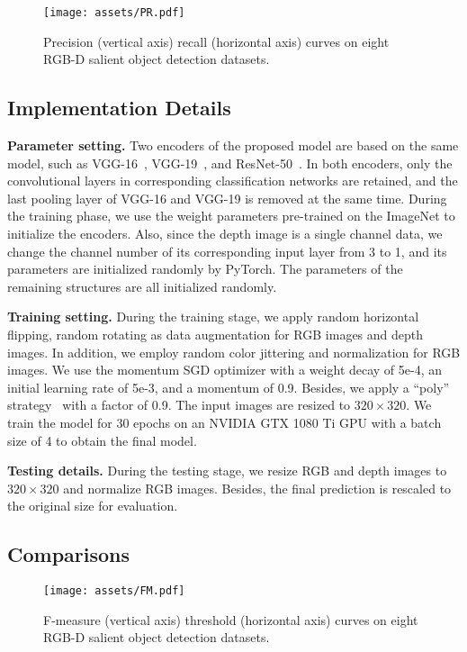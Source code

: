 \documentclass[runningheads]{llncs}
\begin{document}
\begin{figure}[tp]
 \centering
 \texttt{[image: assets/PR.pdf]}
 \caption{Precision (vertical axis) recall (horizontal axis) curves on eight RGB-D salient object detection datasets.}
 \label{fig:pr}
\end{figure}

\subsection{Implementation Details}

\noindent\textbf{Parameter setting.} Two encoders of the proposed model are based on the same model, such as VGG-16~\cite{VGG}, VGG-19~\cite{VGG}, and ResNet-50~\cite{Resnet}. In both encoders, only the convolutional layers in corresponding classification networks are retained, and the last pooling layer of VGG-16 and VGG-19 is removed at the same time. During the training phase, we use the weight parameters pre-trained on the ImageNet to initialize the encoders. Also, since the depth image is a single channel data, we change the channel number of its corresponding input layer from 3 to 1, and its parameters are initialized randomly by PyTorch. The parameters of the remaining structures are all initialized randomly.

\noindent\textbf{Training setting.} During the training stage, we apply random horizontal flipping, random rotating as data augmentation for RGB images and depth images. In addition, we employ random color jittering and normalization for RGB images. We use the momentum SGD optimizer with a weight decay of 5e-4, an initial learning rate of 5e-3, and a momentum of 0.9. Besides, we apply a ``poly'' strategy~\cite{poly} with a factor of 0.9. The input images are resized to $320 \times 320$. We train the model for 30 epochs on an NVIDIA GTX 1080 Ti GPU with a batch size of 4 to obtain the final model.

\noindent\textbf{Testing details.} During the testing stage, we resize RGB and depth images to $320 \times 320$ and normalize RGB images. Besides, the final prediction is rescaled to the original size for evaluation.

\subsection{Comparisons}

\begin{figure}[tp]
 \centering
 \texttt{[image: assets/FM.pdf]}
 \caption{F-measure (vertical axis) threshold (horizontal axis) curves on eight RGB-D salient object detection datasets.}
 \label{fig:fm}
\end{figure}
\end{document}
